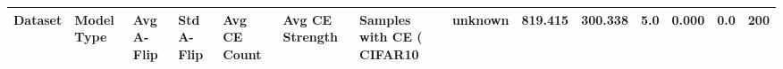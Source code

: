 \begin{tabular}{lllllllr}
\toprule
Dataset & Model Type & Avg A-Flip & Std A-Flip & Avg CE Count & Avg CE Strength & Samples with CE (%
\midrule
CIFAR10 & unknown & 819.415 & 300.338 & 5.0 & 0.000 & 0.0 & 200 \\
\bottomrule
\end{tabular}
